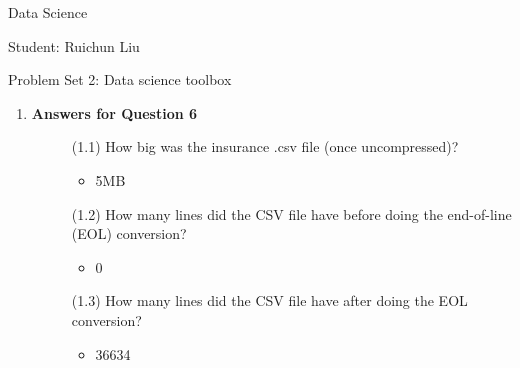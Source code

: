 \documentclass[11pt,a4paper]{article}
\begin{document}
	\begin{center}
		Data Science
		
		Student: Ruichun Liu
		
		Problem Set 2: Data science toolbox
	\end{center}
\begin{enumerate}

    \item \textbf{Answers for Question 6}
		  \begin{description}
	            \item[]	(1.1) How big was the insurance .csv file (once uncompressed)?
                  	 \begin{itemize} 
	                       \item  5MB 

                     \end{itemize}      
	            \item[] (1.2) How many lines did the CSV file have before doing the end-of-line (EOL) conversion?
                  	 \begin{itemize} 
	                       \item 0
                     \end{itemize}  
	            \item[] (1.3) How many lines did the CSV file have after doing the EOL conversion?
                  	 \begin{itemize} 
	                       \item 36634
                     \end{itemize}                       
          \end{description}

          

          
\end{enumerate}
\end{document}
